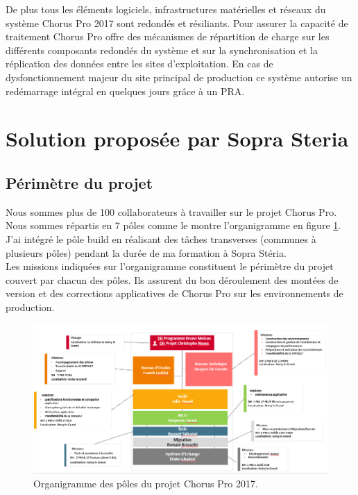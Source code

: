 \documentclass[12pt,a4paper]{article}
\begin{document}
De plus tous les éléments logiciels, infrastructures matérielles et réseaux du système Chorus Pro 2017 sont redondés et résiliants. Pour assurer la capacité de traitement Chorus Pro offre des mécanismes de répartition de charge sur les différents composants redondés du système et sur la synchronisation et la réplication des données entre les sites d’exploitation. En cas de dysfonctionnement majeur du site principal de production ce système autorise un redémarrage intégral en quelques jours grâce à un \gls{PRA}.  
\newpage
\section{Solution proposée par Sopra Steria}
\subsection{Périmètre du projet}
Nous sommes plus de 100 collaborateurs à travailler sur le projet Chorus Pro. Nous sommes répartis en 7 pôles comme le montre l'organigramme en figure \ref{organigramme}. J'ai intégré le pôle build en réalisant des tâches transverses (communes à plusieurs pôles) pendant la durée de ma formation à Sopra Stéria.\\
Les missions indiquées sur l'organigramme constituent le périmètre du projet couvert par chacun des pôles. Ils assurent du bon déroulement des montées de version et des corrections applicatives de Chorus Pro sur les environnements de production.\\
\begin{figure}[!hp]
		\begin{center}
			\includegraphics[width=\textwidth,height=\textheight,keepaspectratio]{organigramme.png}
			\caption{Organigramme des pôles du projet Chorus Pro 2017.}
			\label{organigramme}
		\end{center}
\end{figure}
\end{document}
